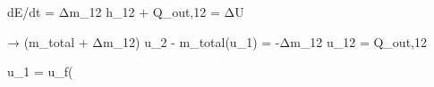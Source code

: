 dE/dt = Δm_12 h_12 + Q_out,12 = ΔU  

→ (m_total + Δm_12) u_2 - m_total(u_1) = -Δm_12 u_12 = Q_out,12  

u_1 = u_f(